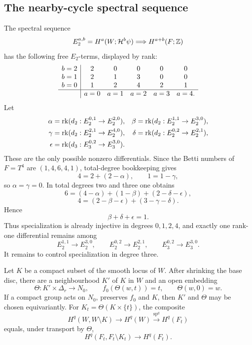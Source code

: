 \subsection{The nearby-cycle spectral sequence}
The spectral sequence
\[
 E_2^{a,b}=H^a(W;\mathcal H^b\psi)\Longrightarrow H^{a+b}(F;\mathbb Z)
\]
has the following free $E_2$-terms, displayed by rank:
\[
\begin{array}{c|ccccc}
b=2&2&0&0&0&0\\
b=1&2&1&3&0&0\\
b=0&1&2&4&2&1\\ \hline
&a=0&a=1&a=2&a=3&a=4.
\end{array}
\]
Let
\begin{align*}
 \alpha&=\operatorname{rk}(d_2:E_2^{0,1}\to E_2^{2,0}),
 &\beta&=\operatorname{rk}(d_2:E_2^{1,1}\to E_2^{3,0}),\\
 \gamma&=\operatorname{rk}(d_2:E_2^{2,1}\to E_2^{4,0}),
 &\delta&=\operatorname{rk}(d_2:E_2^{0,2}\to E_2^{2,1}),\\
 \epsilon&=\operatorname{rk}(d_3:E_3^{0,2}\to E_3^{3,0}).
\end{align*}
These are the only possible nonzero differentials.  Since the Betti
numbers of $F=T^4$ are $(1,4,6,4,1)$, total-degree bookkeeping gives
\[
 4=2+(2-\alpha),
 \qquad
 1=1-\gamma,
\]
so $\alpha=\gamma=0$.  In total degrees two and three one obtains
\[
 6=(4-\alpha)+(1-\beta)+(2-\delta-\epsilon),
\]
\[
 4=(2-\beta-\epsilon)+(3-\gamma-\delta).
\]
Hence
\[
 \beta+\delta+\epsilon=1.
\]
Thus specialization is already injective in degrees $0,1,2,4$, and
exactly one rank-one differential remains among
\[
 E_2^{1,1}\to E_2^{3,0},
 \qquad
 E_2^{0,2}\to E_2^{2,1},
 \qquad
 E_3^{0,2}\to E_3^{3,0}.
\]
It remains to control specialization in degree three.

\begin{lemma}\label{lem:specialization-supports}
Let $K$ be a compact subset of the smooth locus of $W$.  After shrinking
the base disc, there are a neighbourhood $K'$ of $K$ in $W$ and an open
embedding
\[
 \Theta:K'\times\Delta_r\longrightarrow N_0,
 \qquad f_0(\Theta(w,t))=t,
 \qquad \Theta(w,0)=w.
\]
If a compact group acts on $N_0$, preserves $f_0$ and $K$, then $K'$ and
$\Theta$ may be chosen equivariantly.  For
$K_t=\Theta(K\times\{t\})$, the composite
\[
 H^q(W,W\setminus K)\longrightarrow H^q(W)
 \xrightarrow{\operatorname{sp}^q}H^q(F_t)
\]
equals, under transport by $\Theta$,
\[
 H^q(F_t,F_t\setminus K_t)\longrightarrow H^q(F_t).
\]
\end{lemma}

